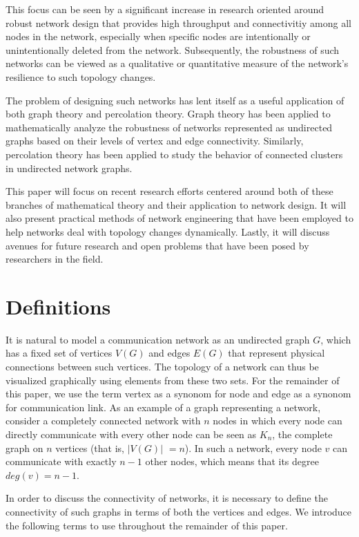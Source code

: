 \documentclass[11pt]{article}
\begin{document}
This focus can be seen by a significant increase in research oriented around robust network design that provides high throughput and connectivitiy among all nodes in the network, especially when specific nodes are intentionally or unintentionally deleted from the network. Subsequently, the robustness of such networks can be viewed as a qualitative or quantitative measure of the network's resilience to such topology changes.

The problem of designing such networks has lent itself as a useful application of both graph theory and percolation theory. Graph theory has been applied to mathematically analyze the robustness of networks represented as undirected graphs based on their levels of vertex and edge connectivity. Similarly, percolation theory has been applied to study the behavior of connected clusters in undirected network graphs. 

This paper will focus on recent research efforts centered around both of these branches of 
mathematical theory and their application to network design. It will also present practical methods of
network engineering that have been employed to help networks deal with topology changes dynamically.
Lastly, it will discuss avenues for future research and open problems that have been posed by 
researchers in the field.

\section{Definitions}

It is natural to model a communication network as an undirected graph $G$, which has a fixed 
set of vertices $V(G)$ and edges $E(G)$ that represent physical connections between such vertices. The topology of a network
can thus be visualized graphically using elements from these two sets. For the remainder of this paper,
we use the term vertex as a synonom for node and edge as a synonom for communication link. As an example of a graph representing a network, consider a completely connected network with $n$ nodes in which every node can directly communicate with every other 
node can be seen as $K_{n}$, the complete graph on $n$ vertices (that is, $|V(G)|$ $= n$). In such a network, every node $v$ can
communicate with exactly $n-1$ other nodes, which means that its degree $deg(v) = n-1$. 

In order to discuss the connectivity of networks, it is necessary to define the connectivity of such
graphs in terms of both the vertices and edges. We introduce the following terms to use throughout 
the remainder of this paper.
\end{document}
